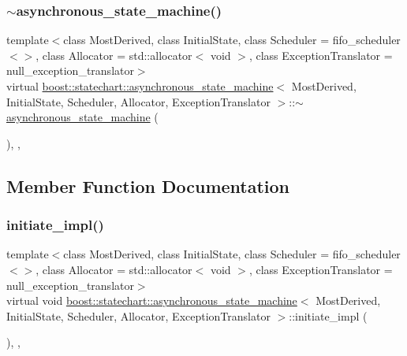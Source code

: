 \subsubsection{\texorpdfstring{$\sim$asynchronous\+\_\+state\+\_\+machine()}{~asynchronous\_state\_machine()}}
{\footnotesize\ttfamily template$<$class Most\+Derived, class Initial\+State, class Scheduler = fifo\+\_\+scheduler$<$$>$, class Allocator = std\+::allocator$<$ void $>$, class Exception\+Translator = null\+\_\+exception\+\_\+translator$>$ \\
virtual \mbox{\hyperlink{classboost_1_1statechart_1_1asynchronous__state__machine}{boost\+::statechart\+::asynchronous\+\_\+state\+\_\+machine}}$<$ Most\+Derived, Initial\+State, Scheduler, Allocator, Exception\+Translator $>$\+::$\sim$\mbox{\hyperlink{classboost_1_1statechart_1_1asynchronous__state__machine}{asynchronous\+\_\+state\+\_\+machine}} (\begin{DoxyParamCaption}{ }\end{DoxyParamCaption})\hspace{0.3cm}{\ttfamily [inline]}, {\ttfamily [protected]}, {\ttfamily [virtual]}}



\subsection{Member Function Documentation}
\mbox{\label{classboost_1_1statechart_1_1asynchronous__state__machine_a346bde99a27dc391a0c4beb8c728dce0}} 
\subsubsection{\texorpdfstring{initiate\+\_\+impl()}{initiate\_impl()}\hspace{0.1cm}{\footnotesize\ttfamily [1/2]}}
{\footnotesize\ttfamily template$<$class Most\+Derived, class Initial\+State, class Scheduler = fifo\+\_\+scheduler$<$$>$, class Allocator = std\+::allocator$<$ void $>$, class Exception\+Translator = null\+\_\+exception\+\_\+translator$>$ \\
virtual void \mbox{\hyperlink{classboost_1_1statechart_1_1asynchronous__state__machine}{boost\+::statechart\+::asynchronous\+\_\+state\+\_\+machine}}$<$ Most\+Derived, Initial\+State, Scheduler, Allocator, Exception\+Translator $>$\+::initiate\+\_\+impl (\begin{DoxyParamCaption}{ }\end{DoxyParamCaption})\hspace{0.3cm}{\ttfamily [inline]}, {\ttfamily [private]}, {\ttfamily [virtual]}}



